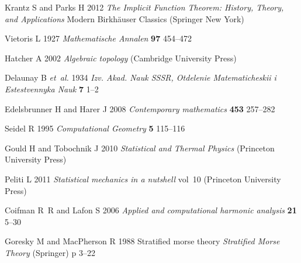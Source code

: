 \documentclass[default,iicol]{sn-jnl}%
\theoremstyle{thmstyleone}%
\theoremstyle{thmstyletwo}%
\theoremstyle{thmstylethree}%
\begin{document}
\begin{thebibliography}{10}
	Krantz S and Parks H 2012 {\em The Implicit Function Theorem: History, Theory,
		and Applications\/} Modern Birkhäuser Classics (Springer New York)
	
	Vietoris L 1927 {\em Mathematische Annalen\/} {\bf 97} 454–472
	
	Hatcher A 2002 {\em Algebraic topology\/} (Cambridge University Press)
	
	Delaunay B {\em et~al.\/} 1934 {\em Izv. Akad. Nauk SSSR, Otdelenie
		Matematicheskii i Estestvennyka Nauk\/} {\bf 7} 1–2
	
	Edelsbrunner H and Harer J 2008 {\em Contemporary mathematics\/} {\bf 453}
	257--282
	
	Seidel R 1995 {\em Computational Geometry\/} {\bf 5} 115–116
	
	Gould H and Tobochnik J 2010 {\em Statistical and Thermal Physics\/} (Princeton
	University Press)
	
	Peliti L 2011 {\em Statistical mechanics in a nutshell\/} vol~10 (Princeton
	University Press)
	
	Coifman R~R and Lafon S 2006 {\em Applied and computational harmonic
		analysis\/} {\bf 21} 5–30
	
	Goresky M and MacPherson R 1988 Stratified morse theory {\em Stratified Morse
		Theory\/} (Springer) p 3–22
	
\end{thebibliography}
\end{document}
